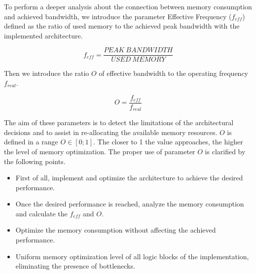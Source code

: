 To perform a deeper analysis about the connection between memory
consumption and achieved bandwidth, we introduce the parameter
Effective Frequency ($f_{eff}$) defined as the ratio of used memory to
the achieved peak bandwidth with the implemented architecture.


$$f_{eff}=\frac{PEAK\ BANDWIDTH}{USED\ MEMORY}$$


Then we introduce the ratio $O$ of effective bandwidth to the
operating frequency $f_{real}$.

$$O=\frac{f_{eff}}{f_{real}}$$


The aim of these parameters is to detect the limitations of the
architectural decisions and to assist in re-allocating the available
memory resources.
$O$ is defined in a range $O\in[0;1]$.
The closer to 1 the value approaches, the higher the level of memory
optimization.
The proper use of parameter $O$ is clarified by the following points.

\begin{itemize}
\item First of all, implement and optimize the architecture to achieve
the desired performance.
\item Once the desired performance is reached, analyze the memory
consumption and calculate the $f_{eff}$ and $O$.
\item Optimize the memory consumption without affecting the achieved
performance.
\item Uniform memory optimization level of all logic blocks of the
implementation, eliminating the presence of bottlenecks.
\end{itemize}


